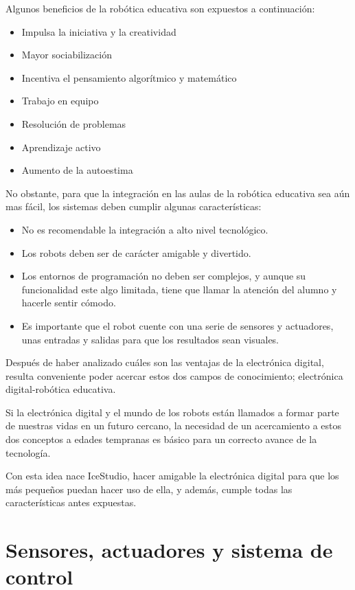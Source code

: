 Algunos beneficios de la robótica educativa son expuestos a continuación:  
\begin{itemize}
	\item Impulsa la iniciativa y la creatividad
	\item Mayor sociabilización
	\item Incentiva el pensamiento algorítmico y matemático
	\item Trabajo en equipo
	\item Resolución de problemas
	\item Aprendizaje activo
	\item Aumento de la autoestima
\end{itemize}

No obstante, para que la integración en las aulas de la robótica educativa sea aún mas fácil, los sistemas deben cumplir algunas características:

\begin{itemize}
	\item No es recomendable la integración a alto nivel tecnológico.
	\item Los robots deben ser de carácter amigable y divertido. 
	\item Los entornos de programación no deben ser complejos, y aunque su funcionalidad este algo limitada, tiene que llamar la atención del alumno y hacerle sentir cómodo.
	\item Es importante que el robot cuente con una serie de sensores y actuadores, unas entradas y salidas para que los resultados sean visuales.
\end{itemize}

Después de haber analizado cuáles son las ventajas de la electrónica digital, resulta conveniente poder acercar estos dos campos de conocimiento; electrónica digital-robótica educativa.\newline

Si la electrónica digital y el mundo de los robots están llamados a formar parte de nuestras vidas en un futuro cercano, la necesidad de un acercamiento a estos dos conceptos a edades tempranas es básico para un correcto avance de la tecnología. \newline

Con esta idea nace IceStudio, hacer amigable la electrónica digital para que los más pequeños puedan hacer uso de ella, y además, cumple todas las características antes expuestas.

\section{Sensores, actuadores y sistema de control }

